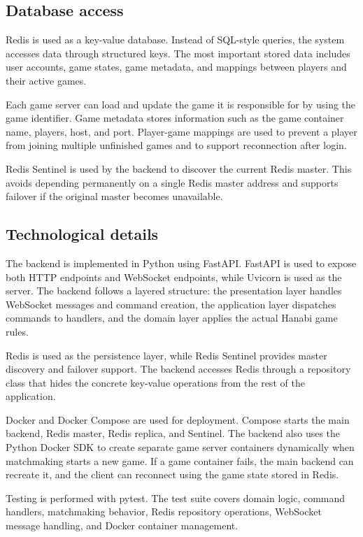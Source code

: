 \documentclass{scrartcl}
\begin{document}
\subsection{Database access}

Redis is used as a key-value database. 
Instead of SQL-style queries, the system accesses data through structured keys. 
The most important stored data includes user accounts, game states, game metadata, and mappings between players and their active games.

Each game server can load and update the game it is responsible for by using the game identifier. 
Game metadata stores information such as the game container name, players, host, and port. 
Player-game mappings are used to prevent a player from joining multiple unfinished games and to support reconnection after login.

Redis Sentinel is used by the backend to discover the current Redis master. 
This avoids depending permanently on a single Redis master address and supports failover if the original master becomes unavailable.

\subsection{Technological details}\label{technological-details}

The backend is implemented in Python using FastAPI\@.
FastAPI is used to expose both HTTP endpoints and WebSocket endpoints, while Uvicorn is used as the server. 
The backend follows a layered structure: the presentation layer handles WebSocket messages and command creation, the application layer dispatches commands to handlers, and the domain layer applies the actual Hanabi game rules.

Redis is used as the persistence layer, while Redis Sentinel provides master discovery and failover support. 
The backend accesses Redis through a repository class that hides the concrete key-value operations from the rest of the application.

Docker and Docker Compose are used for deployment. 
Compose starts the main backend, Redis master, Redis replica, and Sentinel. 
The backend also uses the Python Docker SDK to create separate game server containers dynamically when matchmaking starts a new game. 
If a game container fails, the main backend can recreate it, and the client can reconnect using the game state stored in Redis.

Testing is performed with pytest. 
The test suite covers domain logic, command handlers, matchmaking behavior, Redis repository operations, WebSocket message handling, and Docker container management.
\end{document}
